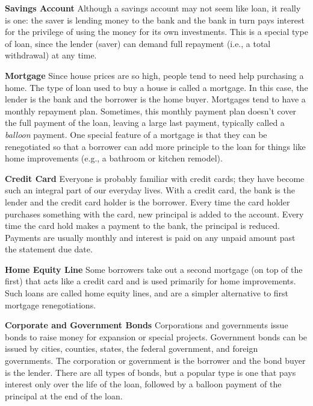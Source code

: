 \documentclass[letterpaper]{article}
\begin{document}
\begin{description}

\item{\textbf{Savings Account}} Although a savings account may not seem like
  loan, it really is one: the saver is lending money to the bank and the bank
  in turn pays interest for the privilege of using the money for its own
  investments.  This is a special type of loan, since the lender (saver) can
  demand full repayment (i.e., a total withdrawal) at any time.

\item{\textbf{Mortgage}} Since house prices are so high, people tend to need
  help purchasing a home. The type of loan used to buy a house is called a
  mortgage. In this case, the lender is the bank and the borrower is the home
  buyer. Mortgages tend to have a monthly repayment plan.  Sometimes, this
  monthly payment plan doesn't cover the full payment of the loan, leaving a
  large last payment, typically called a \emph{balloon} payment.  One special
  feature of a mortgage is that they can be renegotiated so that a borrower can
  add more principle to the loan for things like home improvements (e.g., a
  bathroom or kitchen remodel).

\item{\textbf{Credit Card}} Everyone is probably familiar with credit cards;
  they have become such an integral part of our everyday lives. With a credit
  card, the bank is the lender and the credit card holder is the borrower.
  Every time the card holder purchases something with the card, new principal
  is added to the account. Every time the card hold makes a payment to the
  bank, the principal is reduced. Payments are usually monthly and interest is
  paid on any unpaid amount past the statement due date.

\item{\textbf{Home Equity Line}} Some borrowers take out a second mortgage (on
  top of the first) that acts like a credit card and is used primarily for home
  improvements. Such loans are called home equity lines, and are a simpler
  alternative to first mortgage renegotiations.

\item{\textbf{Corporate and Government Bonds}} Corporations and governments
  issue bonds to raise money for expansion or special projects.  Government
  bonds can be issued by cities, counties, states, the federal government, and
  foreign governments. The corporation or government is the borrower and the
  bond buyer is the lender. There are all types of bonds, but a popular type is
  one that pays interest only over the life of the loan, followed by a balloon
  payment of the principal at the end of the loan.

\end{description}
\end{document}
